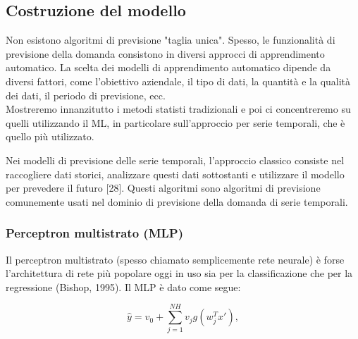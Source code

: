 \documentclass[12pt,a4paper]{report}
\begin{document}
\subsection{Costruzione del modello}
Non esistono algoritmi di previsione "taglia unica". Spesso, le funzionalità di previsione della domanda consistono in diversi approcci di apprendimento automatico. La scelta dei modelli di apprendimento automatico dipende da diversi fattori, come l'obiettivo aziendale, il tipo di dati, la quantità e la qualità dei dati, il periodo di previsione, ecc.\\
Mostreremo innanzitutto  i metodi statisti tradizionali e poi ci concentreremo su quelli utilizzando il ML, in particolare sull'approccio per serie temporali, che è quello più utilizzato.

Nei modelli di previsione delle serie temporali, l'approccio classico consiste nel raccogliere dati storici, analizzare questi dati sottostanti e utilizzare il modello per prevedere il futuro [28]. Questi algoritmi sono algoritmi di previsione comunemente usati nel dominio di previsione della domanda di serie temporali.

\subsubsection{Perceptron multistrato (MLP)}
Il perceptron multistrato (spesso chiamato semplicemente rete neurale) è forse l'architettura di rete più popolare oggi in uso sia per la classificazione che per la regressione (Bishop, 1995). Il MLP è dato come segue:

\begin{equation}
{\displaystyle \hat{y} = v_0 + \sum\limits_{j=1}^{NH} v_jg(w_{j}^{T}x')} ,
\end{equation}
\end{document}
